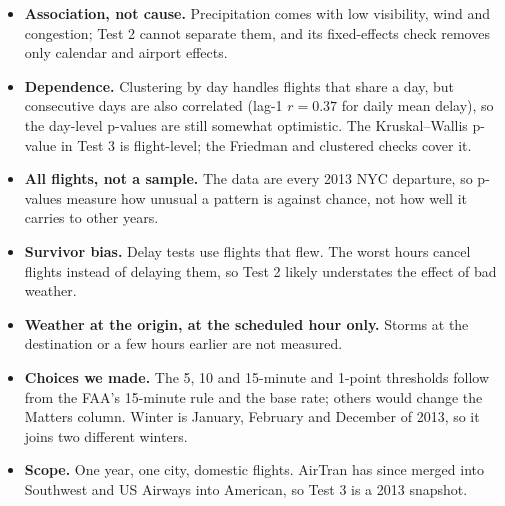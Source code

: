 \documentclass[10pt,a4paper,twocolumn]{article}
\begin{document}
\begin{itemize}
  \item \textbf{Association, not cause.} Precipitation comes with low visibility, wind and
  congestion; Test 2 cannot separate them, and its fixed-effects check removes only calendar and
  airport effects.
  \item \textbf{Dependence.} Clustering by day handles flights that share a day, but consecutive
  days are also correlated (lag-1 $r=0.37$ for daily mean delay), so the day-level p-values are
  still somewhat optimistic. The Kruskal--Wallis p-value in Test 3 is flight-level; the Friedman
  and clustered checks cover it.
  \item \textbf{All flights, not a sample.} The data are every 2013 NYC departure, so p-values
  measure how unusual a pattern is against chance, not how well it carries to other years.
  \item \textbf{Survivor bias.} Delay tests use flights that flew. The worst hours cancel flights
  instead of delaying them, so Test 2 likely understates the effect of bad weather.
  \item \textbf{Weather at the origin, at the scheduled hour only.} Storms at the destination or a
  few hours earlier are not measured.
  \item \textbf{Choices we made.} The 5, 10 and 15-minute and 1-point thresholds follow from the
  FAA's 15-minute rule and the base rate; others would change the Matters column. Winter is
  January, February and December of 2013, so it joins two different winters.
  \item \textbf{Scope.} One year, one city, domestic flights. AirTran has since merged into
  Southwest and US Airways into American, so Test 3 is a 2013 snapshot.
\end{itemize}
\end{document}
